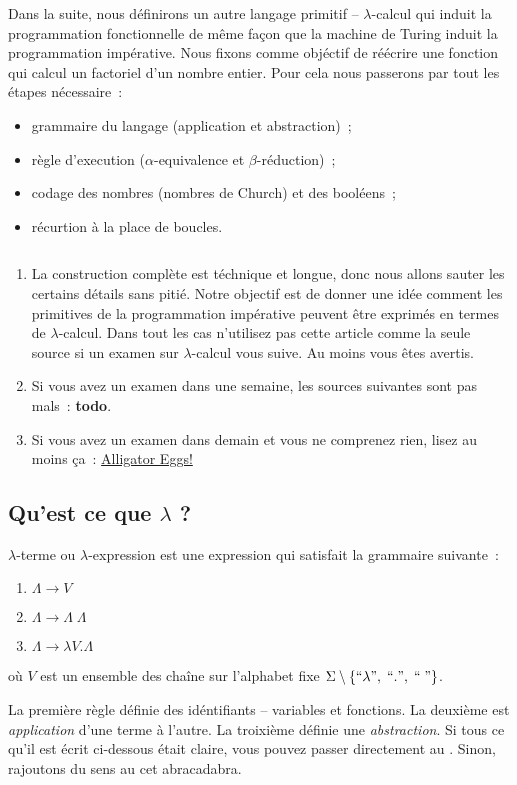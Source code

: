 Dans la suite, nous définirons un autre langage primitif -- $\lambda$-calcul qui induit la programmation fonctionnelle de même façon que la machine de Turing induit la programmation impérative.
Nous fixons comme objéctif de réécrire une fonction qui calcul un factoriel d'un nombre entier.
Pour cela nous passerons par tout les étapes nécessaire~:
\begin{itemize}
	\item grammaire du langage (application et abstraction)~;
	\item règle d'execution ($\alpha$-equivalence et $\beta$-réduction)~;
	\item codage des nombres (nombres de Church) et des booléens~;
	\item récurtion à la place de boucles.
\end{itemize}

\begin{remark}
	$\quad$
	\begin{enumerate}
		\item
			La construction complète est téchnique et longue, donc nous allons sauter les certains détails sans pitié. Notre objectif est de donner une idée comment les primitives de la programmation impérative peuvent être exprimés en termes de $\lambda$-calcul. Dans tout les cas n'utilisez pas cette article comme la seule source si un examen sur $\lambda$-calcul vous suive. Au moins vous êtes avertis.
		\item
			Si vous avez un examen dans une semaine, les sources suivantes sont pas mals~: \textbf{todo}.
		\item
			Si vous avez un examen dans demain et vous ne comprenez rien, lisez au moins ça~: \href{http://worrydream.com/AlligatorEggs/}{Alligator Eggs!}
	\end{enumerate}
\end{remark}

\subsection*{Qu'est ce que $\lambda$ ?}
\begin{definition}
	$\lambda$-terme ou $\lambda$-expression est une expression qui satisfait la grammaire suivante~:
	\begin{enumerate}
		\item $\Lambda \to V$
		\item $\Lambda \to \Lambda \; \Lambda$
		\item $\Lambda \to \lambda V. \Lambda$
	\end{enumerate}
	où $V$ est un ensemble des chaîne sur l'alphabet fixe $\Sigma \setminus \{``\lambda", \; ``.", \; ``\;"\}$.
\end{definition}
La première règle définie des idéntifiants -- variables et fonctions.
La deuxième est \emph{application} d'une terme à l'autre.
La troixième définie une \emph{abstraction}.
Si tous ce qu'il est écrit ci-dessous était claire, vous pouvez passer directement au .
Sinon, rajoutons du sens au cet abracadabra.

